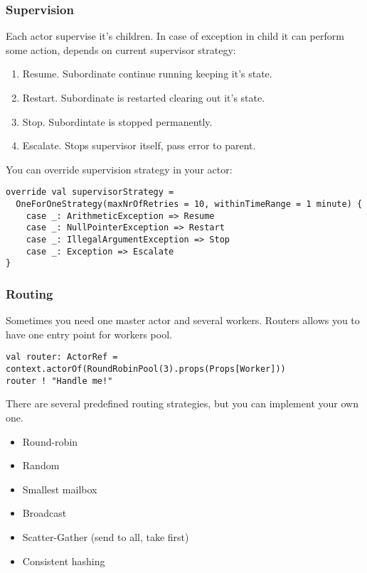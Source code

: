 \begin{frame}[fragile]
\frametitle{Supervision}
Each actor supervise it's children.  In case of exception in child it can perform some action,
depends on current supervisor strategy:
\begin{enumerate}
\item Resume. Subordinate continue running keeping it's state.
\item Restart. Subordinate is restarted clearing out it's state.
\item Stop. Subordintate is stopped permanently.
\item Escalate. Stops supervisor itself, pass error to parent.
\end{enumerate}
You can override supervision strategy in your actor:
\begin{lstlisting}
override val supervisorStrategy =
  OneForOneStrategy(maxNrOfRetries = 10, withinTimeRange = 1 minute) {
    case _: ArithmeticException => Resume
    case _: NullPointerException => Restart
    case _: IllegalArgumentException => Stop
    case _: Exception => Escalate
}
\end{lstlisting}
\end{frame}

\begin{frame}[fragile]
\frametitle{Routing}
Sometimes you need one master actor and several workers.  Routers allows you to have one
entry point for workers pool.
\begin{lstlisting}
val router: ActorRef = context.actorOf(RoundRobinPool(3).props(Props[Worker]))
router ! "Handle me!"
\end{lstlisting}
There are several predefined routing strategies, but you can implement your own one.
\begin{itemize}
\item Round-robin
\item Random
\item Smallest mailbox
\item Broadcast
\item Scatter-Gather (send to all, take first)
\item Consistent hashing
\end{itemize}
\end{frame}

